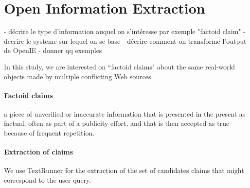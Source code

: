 \section{Open Information Extraction}
-  décrire le type d'information auquel on s'intéresse par exemple "factoid claim"
- decrire le systeme sur lequel on se base
- décrire comment on transforme l'output de OpenIE
- donner qq exemples

In this study, we are interested on ``factoid claims" about the same real-world objects
made by multiple conflicting Web sources.
\paragraph*{Factoid claims} a piece of unverified or inaccurate information that is
presented in the present as factual, often as part of a publicity effort, and that is 
then accepted as true because of frequent repetition.
\paragraph*{Extraction of claims}We use TextRunner for the extraction of the set of 
candidates claims that might correspond to the user query.
